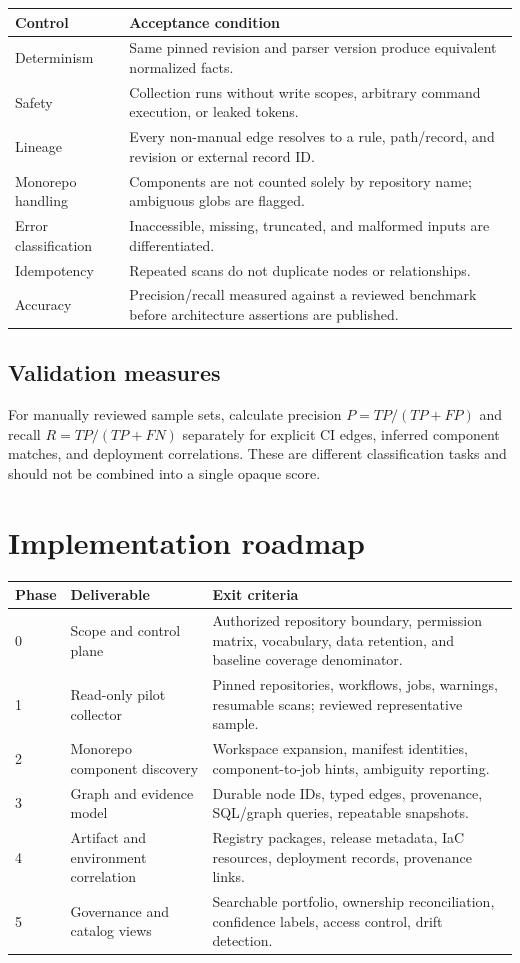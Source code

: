 \documentclass[11pt,letterpaper]{article}
\begin{document}
\begin{tabularx}{\linewidth}{@{}P{1.9in}Y@{}}
\toprule
\textbf{Control} & \textbf{Acceptance condition} \\
\midrule
Determinism & Same pinned revision and parser version produce equivalent normalized facts. \\
Safety & Collection runs without write scopes, arbitrary command execution, or leaked tokens. \\
Lineage & Every non-manual edge resolves to a rule, path/record, and revision or external record ID. \\
Monorepo handling & Components are not counted solely by repository name; ambiguous globs are flagged. \\
Error classification & Inaccessible, missing, truncated, and malformed inputs are differentiated. \\
Idempotency & Repeated scans do not duplicate nodes or relationships. \\
Accuracy & Precision/recall measured against a reviewed benchmark before architecture assertions are published. \\
\bottomrule
\end{tabularx}

\subsection{Validation measures}
For manually reviewed sample sets, calculate precision \(P=TP/(TP+FP)\) and recall \(R=TP/(TP+FN)\) separately for explicit CI edges, inferred component matches, and deployment correlations. These are different classification tasks and should not be combined into a single opaque score.

\section{Implementation roadmap}
\begin{longtable}{@{}P{0.75in}P{2.05in}P{3.25in}@{}}
\toprule
\textbf{Phase} & \textbf{Deliverable} & \textbf{Exit criteria} \\
\midrule
{} & Scope and control plane & Authorized repository boundary, permission matrix, vocabulary, data retention, and baseline coverage denominator. \\
1 & Read-only pilot collector & Pinned repositories, workflows, jobs, warnings, resumable scans; reviewed representative sample. \\
2 & Monorepo component discovery & Workspace expansion, manifest identities, component-to-job hints, ambiguity reporting. \\
3 & Graph and evidence model & Durable node IDs, typed edges, provenance, SQL/graph queries, repeatable snapshots. \\
4 & Artifact and environment correlation & Registry packages, release metadata, IaC resources, deployment records, provenance links. \\
5 & Governance and catalog views & Searchable portfolio, ownership reconciliation, confidence labels, access control, drift detection. \\
\bottomrule
\end{longtable}
\end{document}
